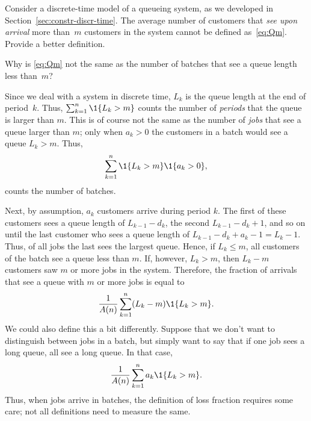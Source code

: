 \begin{exercise}
  Consider a discrete-time model of a queueing system, as we developed in Section~\ref{sec:constr-discr-time}.
  The average number of customers that \emph{see upon arrival} more than~$m$ customers in the system cannot be defined as~\eqref{eq:Qm}.
  Provide a better definition.
  \begin{hint}
    Why is \eqref{eq:Qm} not the same as the number of batches that see a queue length less than~$m$?
  \end{hint}
  \begin{solution} Since we deal with a system in discrete time, $L_k$ is the queue length at the end of period~$k$.
    Thus, $\sum_{k=1}^n \1{L_k > m}$ counts the number of \emph{periods} that the queue is larger than $m$.
    This is of course not the same as the number of \emph{jobs} that see a queue larger than $m$; only when $a_k>0$ the customers in a batch would see a queue $L_k>m$.
    Thus,
    \begin{equation*}
      \sum_{k=1}^n \1{L_k > m} \1{a_k > 0},
    \end{equation*}
    counts the number of batches. 

    Next, by assumption, $a_k$ customers arrive during period $k$.
    The first of these customers sees a queue length of $L_{k-1} - d_k$, the second $L_{k-1}-d_k + 1$, and so on until the last customer who sees a queue length of $L_{k-1} - d_k + a_k -1 = L_k -1$.
    Thus, of all jobs the last sees the largest queue.
    Hence, if $L_k \leq m$, all customers of the batch see a queue less than $m$.
    If, however, $L_k > m$, then $L_k -m$ customers saw $m$ or more jobs in the system.
    Therefore, the fraction of arrivals that see a queue with $m$ or more jobs is equal to
\begin{equation*}
  \frac 1 {A(n)} \sum_{k=1}^n (L_k - m) \1{L_k > m} .
\end{equation*}
We could also define this a bit differently.
Suppose that we don't want to distinguish between jobs in a batch, but simply want to say that if one job sees a long queue, all see a long queue.
In that case,
\begin{equation*}
\frac 1{A(n)}\sum_{k=1}^n a_k \1{L_k > m}.
\end{equation*}
Thus, when jobs arrive in batches, the definition of loss fraction requires some care; not all definitions need to measure the same.
  \end{solution}
\end{exercise}






  



